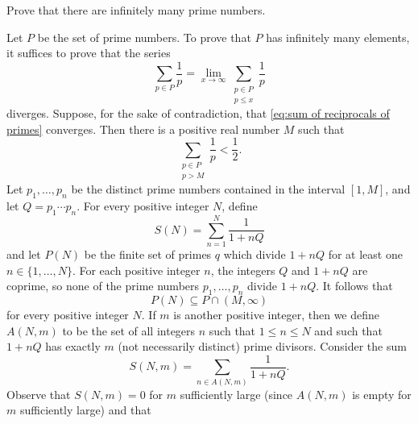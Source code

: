 \documentclass{homework}
\begin{document}
\maketitle

\begin{problem}
Prove that there are infinitely many prime numbers.
\end{problem}

\begin{solution}
Let $P$ be the set of prime numbers.
To prove that $P$ has infinitely many elements, it suffices to prove
that the series
\begin{equation}
\label{eq:sum of reciprocals of primes}
\sum_{p \in P} \frac{1}{p}
= \lim_{x \to \infty} \sum_{\substack{p \in P \\ p \leq x}} \frac{1}{p}
\end{equation}
diverges.
Suppose, for the sake of contradiction, that
\eqref{eq:sum of reciprocals of primes} converges.
Then there is a positive real number $M$ such that
\begin{equation}
\label{eq:tail of sum of reciprocals of primes}
\sum_{\substack{p \in P \\ p > M}} \frac{1}{p} < \frac{1}{2}.
\end{equation}
Let $p_1,\ldots,p_n$ be the distinct prime numbers contained in the interval
$[1,M]$, and let $Q = p_1 \cdots p_n$.
For every positive integer $N$, define
\begin{equation*}
S(N) = \sum_{n=1}^N \frac{1}{1 + n Q}
\end{equation*}
and let $P(N)$ be the finite set of primes $q$ which divide $1 + n Q$ for at
least one $n \in \{1,\ldots,N\}$.
For each positive integer $n$, the integers $Q$ and $1 + n Q$ are coprime, so
none of the prime numbers $p_1,\ldots,p_n$ divide $1 + n Q$.
It follows that
\begin{equation}
\label{eq:P(N) subset}
P(N) \subseteq P \cap (M, \infty)
\end{equation}
for every positive integer $N$.
If $m$ is another positive integer, then we define $A(N, m)$ to be the set of
all integers $n$ such that $1 \leq n \leq N$ and such that $1 + n Q$ has exactly
$m$ (not necessarily distinct) prime divisors.
Consider the sum
\begin{equation*}
S(N, m) = \sum_{n \in A(N, m)} \frac{1}{1 + n Q}.
\end{equation*}
Observe that $S(N, m) = 0$ for $m$ sufficiently large (since $A(N,m)$ is empty
for $m$ sufficiently large) and that
\begin{equation}

\end{equation}
\end{solution}
\end{document}
